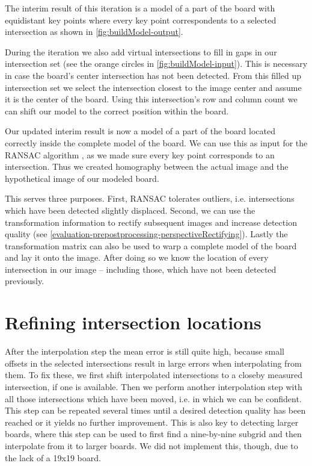 	The interim result of this iteration is a model of a part of the board with equidistant key points where every key point correspondents to a selected intersection as shown in \autoref{fig:buildModel-output}.

	During the iteration we also add virtual intersections to fill in gaps in our intersection set (see the orange circles in \autoref{fig:buildModel-input}). This is necessary in case the board's center intersection has not been detected. From this filled up intersection set we select the intersection closest to the image center and assume it is the center of the board. Using this intersection's row and column count we can shift our model to the correct position within the board.

	Our updated interim result is now a model of a part of the board located correctly inside the complete model of the board. We can use this as input for the RANSAC algorithm \cite{fischler1981random}, as we made sure every key point corresponds to an intersection. Thus we created homography between the actual image and the hypothetical image of our modeled board.

	This serves three purposes. First, RANSAC tolerates outliers, i.e. intersections which have been detected slightly displaced. Second, we can use the transformation information to rectify subsequent images and increase detection quality (see \autoref{evaluation-prepostprocessing-perspectiveRectifying}). Lastly the transformation matrix can also be used to warp a complete model of the board and lay it onto the image. After doing so we know the location of every intersection in our image -- including those, which have not been detected previously.

	\section{Refining intersection locations}
	\label{detector-postprocessing}
	After the interpolation step the mean error is still quite high, because small offsets in the selected intersections result in large errors when interpolating from them. To fix these, we first shift interpolated intersections to a closeby measured intersection, if one is available. Then we perform another interpolation step with all those intersections which have been moved, i.e. in which we can be confident. This step can be repeated several times until a desired detection quality has been reached or it yields no further improvement. This is also key to detecting larger boards, where this step can be used to first find a nine-by-nine subgrid and then interpolate from it to larger boards. We did not implement this, though, due to the lack of a 19x19 board.

